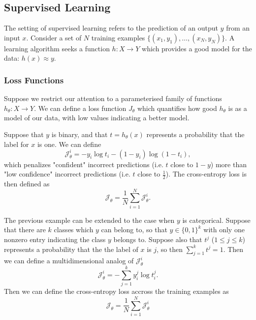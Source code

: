 \subsection{Supervised Learning}

The setting of supervised learning refers to the prediction of an output $y$ from an input $x$. Consider a set of $N$ training examples $\{(x_1, y_1), \ldots, (x_N, y_N)\}$. A learning algorithm seeks a function $h: X \rightarrow Y$ which provides a good model for the data: $h(x) \approx y$.


\subsubsection{Loss Functions}

Suppose we restrict our attention to a parameterised family of functions $h_{\theta}: X \rightarrow Y$. We can define a loss function $J_{\theta}$ which quantifies how good $h_{\theta}$ is as a model of our data, with low values indicating a better model.

\begin{example}
    Suppose that $y$ is binary, and that $t = h_{\theta}(x)$ represents a probability that the label for $x$ is one. We can define
    $$
    \mathcal{J}_\theta^i = - y_i \log t_i - (1 - y_i) \log(1 - t_i),
    $$
    which penalizes "confident" incorrect predictions (i.e. $t$ close to $1 - y$) more than "low confidence" incorrect predictions (i.e. $t$ close to $\frac 1 2$). The cross-entropy loss is then defined as
    $$
    \mathcal{J}_{\theta} = \frac{1}{N} \sum_{i=1}^N \mathcal{J}_\theta^i.
    $$
\end{example}

\begin{example}
    The previous example can be extended to the case when $y$ is categorical. Suppose that there are $k$ classes which $y$ can belong to, so that $y \in \{0, 1\}^k$ with only one nonzero entry indicating the class $y$ belongs to. Suppose also that $t^j$ ($1 \leq j \leq k$) represents a probability that the the label of $x$ is $j$, so then $\sum_{j=1}^k t^j = 1$. Then we can define a multidimensional analog of $\mathcal{J}_\theta^i$
    $$
    \mathcal{J}_\theta^i = - \sum_{j=1}^k y_i^j \log t_i^j.
    $$
    Then we can define the cross-entropy loss accross the training examples as
    $$
    \mathcal{J}_{\theta} = \frac{1}{N} \sum_{i=1}^N \mathcal{J}_\theta^i
    $$
\end{example}

